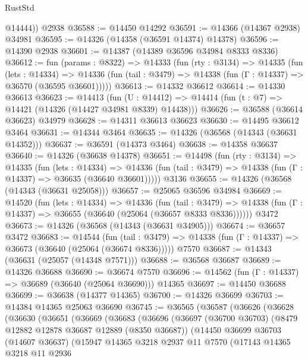 \begin{lexlean}{RustStd}
\begin{coremodule}
        @14444))
    @2938
@36588 := @14450 @14292
@36591 := @14366 (@14367 @2938) @34981
@36595 := @14326 (@14358 (@36591 @14374) @14378)
@36596 := @14390 @2938
@36601 := @14387 (@14389 @36596 @34984 @8333 @8336)
@36612 := fun (params : @8322) =>
  @14333
    (fun (rty : @3134) =>
    @14335
      (fun (lets : @14334) =>
      @14336 (fun (tail : @3479) => @14338 (fun (Γ : @14337) => @36570 (@36595 @36601)))))
@36613 := @14332 @36612
@36614 := @14330 @36613
@36623 := @14413
    (fun (U : @14412) => @14414 (fun (t : @7) => @14421 (@14326 (@14427 @34981 @8339) @14438)))
@36626 := @36588 (@36614 @36623) @34979
@36628 := @14311 @36613 @36623
@36630 := @14495 @36612 @3464
@36631 := @14344 @3464
@36635 := @14326 (@36568 (@14343 (@36631 @14352)))
@36637 := @36591 (@14373 @3464)
@36638 := @14358 @36637
@36640 := @14326 (@36638 @14378)
@36651 := @14498
    (fun (rty : @3134) =>
    @14335
      (fun (lets : @14334) =>
      @14336 (fun (tail : @3479) => @14338 (fun (Γ : @14337) => @36635 (@36640 @36601)))))
    @3136
@36655 := @14326 (@36568 (@14343 (@36631 @25058)))
@36657 := @25065 @36596 @34984
@36669 := @14520
    (fun (lets : @14334) =>
    @14336
      (fun (tail : @3479) =>
      @14338 (fun (Γ : @14337) => @36655 (@36640 (@25064 (@36657 @8333 @8336))))))
    @3472
@36673 := @14326 (@36568 (@14343 (@36631 @34905)))
@36674 := @36657 @3472
@36683 := @14544
    (fun (tail : @3479) => @14338 (fun (Γ : @14337) => @36673 (@36640 (@25064 (@36674 @8336)))))
    @7570
@36687 := @14343 (@36631 (@25057 (@14348 @7571)))
@36688 := @36568 @36687
@36689 := @14326 @36688
@36690 := @36674 @7570
@36696 := @14562 (fun (Γ : @14337) => @36689 (@36640 (@25064 @36690))) @14365
@36697 := @14450 @36688
@36699 := @36638 (@14377 @14365)
@36700 := @14326 @36699
@36703 := @14384 @14365 @25063 @36690
@36745 := @36565
    (@36587
      (@36626
        (@36628
          (@36630
            (@36651
              (@36669
                (@36683
                  (@36696
                    (@36697
                      (@36700 @36703)
                      (@8479 @12882 @12878 @36687 @12889 (@8350 @36687))
                      (@14450
                        @36699
                        @36703
                        (@14607 @36637)
                        (@15947
                          @14365
                          @3218
                          @2937
                          @11
                          @7570
                          (@17143
                            @14365
                            @3218
                            @11
                            @2936

\end{coremodule}
\end{lexlean}
